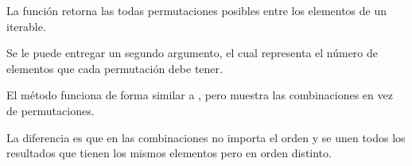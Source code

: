 La función  retorna las todas permutaciones posibles entre los elementos de un iterable.



Se le puede entregar un segundo argumento, el cual representa el número de elementos que cada permutación debe tener.


El método  funciona de forma similar a , pero muestra las combinaciones en vez de permutaciones.


La diferencia es que en las combinaciones no importa el orden y se unen todos los resultados que tienen los mismos elementos pero en orden distinto.

\clearpage